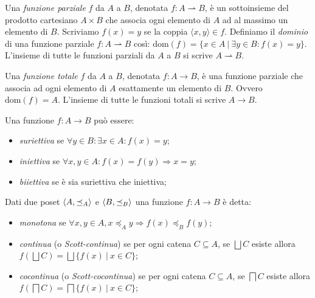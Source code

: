 \begin{definition}
Una \textit{funzione parziale} \(f\) da \(A\) a \(B\), denotata \(f:A\rightharpoonup B\), è un sottoinsieme del prodotto cartesiano \(A\times B\) che associa ogni elemento di \(A\) ad al massimo un elemento di \(B\). Scriviamo \(f(x)=y\) se la coppia \(\langle x, y\rangle\in f\). Definiamo il \textit{dominio} di una funzione parziale \(f:A\rightharpoonup B\) così: \(\textrm{dom}(f)=\{x\in A\ |\ \exists y\in B:f(x)=y\}\). L'insieme di tutte le funzioni parziali da \(A\) a \(B\) si scrive \(A\rightharpoonup B\).
\end{definition}

\begin{definition}
Una \textit{funzione totale} \(f\) da \(A\) a \(B\), denotata \(f:A\rightarrow B\), è una funzione parziale che associa ad ogni elemento di \(A\) esattamente un elemento di \(B\). Ovvero \(\textrm{dom}(f)=A\). L'insieme di tutte le funzioni totali si scrive \(A\rightarrow B\).
\end{definition}

\begin{definition}
Una funzione \(f:A\rightarrow B\) può essere:
\begin{itemize}
    \item \textit{suriettiva} se \(\forall y\in B : \exists x\in A: f(x)=y\);
    \item \textit{iniettiva} se \(\forall x,y\in A : f(x)=f(y)\Rightarrow x=y\);
    \item \textit{biiettiva} se è sia suriettiva che iniettiva;
\end{itemize}
Dati due poset \(\langle A, \preceq_{A}\rangle\) e \(\langle B, \preceq_{B}\rangle\) una funzione \(f:A\rightarrow B\) è detta:
\begin{itemize}
    \item \textit{monotona} se \(\forall x,y\in A, x\preceq_A y\Rightarrow f(x)\preceq_B f(y)\);
    \item \textit{continua} (o \textit{Scott-continua}) se per ogni catena \(C\subseteq A\), se \(\bigsqcup C\) esiste allora \(f(\bigsqcup C)=\bigsqcup\{f(x)\ |\ x\in C\}\);
    \item \textit{cocontinua} (o \textit{Scott-cocontinua}) se per ogni catena \(C\subseteq A\), se \(\bigsqcap C\) esiste allora \(f(\bigsqcap C)=\bigsqcap\{f(x)\ |\ x\in C\}\);
\end{itemize}
\end{definition}

